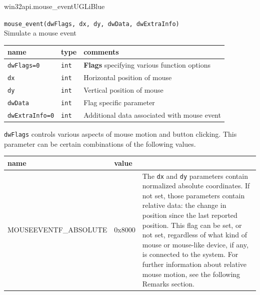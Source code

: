 \documentclass[a4paper,10pt,cours,firamath]{nsi}
\begin{document}
\begin{encadrecolore}{win32api.mouse\_event}{UGLiBlue}
	
	\texttt{mouse_event(dwFlags, dx, dy, dwData, dwExtraInfo)}\\
	
	Simulate a mouse event\\
	
	
	\begin{center}
		\begin{tabularx}{\textwidth}{|l|l|l|}
			\hline\rowcolor{UGLiBlue}
			\color{white}\textbf{name}         & \color{white}\textbf{type} & \color{white}\textbf{comments}                     \\
			\hline
			\texttt{dwFlags=0}     & \texttt{int}   & \textbf{Flags} specifying various function options \\
			\hline
			\texttt{dx}            & \texttt{int}   & Horizontal position of mouse                       \\
			\hline
			\texttt{dy}            & \texttt{int}   & Vertical position of mouse                         \\
			\hline
			\texttt{dwData}        & \texttt{int}   & Flag specific parameter                            \\
			\hline
			\texttt{dwExtraInfo=0} & \texttt{int}   & Additional data associated with mouse event        \\
			\hline
		\end{tabularx}
	\end{center}
	\texttt{dwFlags} controls various aspects of mouse motion and button clicking. This parameter can be certain combinations of the following values.
	\begin{center}
		\scriptsize
		\begin{tabularx}{\textwidth}{|l|l|X|}
			\hline\rowcolor{UGLiBlue}
			\color{white}\textbf{name } & \color{white}\textbf{value} &                                                                                                                                                                                                                                                                                                                                                                                                        \\
			\hline
			MOUSEEVENTF\_ABSOLUTE       & 0x8000                      & The \texttt{dx} and \texttt{dy} parameters contain normalized absolute coordinates. If not set, those parameters contain relative data: the change in position since the last reported position. This flag can be set, or not set, regardless of what kind of mouse or mouse-like device, if any, is connected to the system. For further information about relative mouse motion, see the following Remarks section. \\

\end{tabularx}
\end{center}
\end{encadrecolore}
\end{document}
